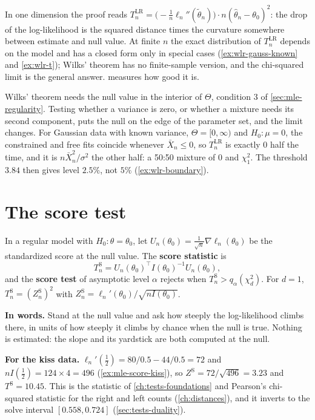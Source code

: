In one dimension the proof reads $T^{\mathrm{LR}}_n = \big(-\frac1n\ell_n''(\tilde{\theta}_n)\big)\cdot n(\hat{\theta}_n - \theta_0)^2$: the drop of the log-likelihood is the squared distance times the curvature somewhere between estimate and null value.
At finite $n$ the exact distribution of $T^{\mathrm{LR}}_n$ depends on the model and has a closed form only in special cases (\cref{ex:wlr-gauss-known} and \cref{ex:wlr-t}); Wilks' theorem has no finite-sample version, and the chi-squared limit is the general answer.
 measures how good it is.

\begin{pitfall}
Wilks' theorem needs the null value in the interior of $\Theta$, condition 3 of \cref{sec:mle-regularity}.
Testing whether a variance is zero, or whether a mixture needs its second component, puts the null on the edge of the parameter set, and the limit changes.
For Gaussian data with known variance, $\Theta = [0, \infty)$ and $H_0: \mu = 0$, the constrained and free fits coincide whenever $\bar{X}_n \leq 0$, so $T^{\mathrm{LR}}_n$ is exactly $0$ half the time, and it is $n\bar{X}_n^2/\sigma^2$ the other half: a 50:50 mixture of $0$ and $\chi^2_1$.
The threshold $3.84$ then gives level $2.5\%$, not $5\%$ (\cref{ex:wlr-boundary}).
\end{pitfall}

\section{The score test}
\label{sec:wlr-score}

\begin{definition}
\label{def:score-test}
In a regular model with $H_0: \theta = \theta_0$, let $U_n(\theta_0) = \frac{1}{\sqrt{n}}\nabla\ell_n(\theta_0)$ be the standardized score at the null value.
The \textbf{score statistic} is
\[
T^{\mathrm{S}}_n = U_n(\theta_0)^\top I(\theta_0)^{-1}U_n(\theta_0),
\]
and the \textbf{score test} of asymptotic level $\alpha$ rejects when $T^{\mathrm{S}}_n > q_\alpha(\chi^2_d)$.
For $d = 1$, $T^{\mathrm{S}}_n = (Z^{\mathrm{S}}_n)^2$ with $Z^{\mathrm{S}}_n = \ell_n'(\theta_0)/\sqrt{nI(\theta_0)}$.
\end{definition}

\begin{inwords}
\textbf{In words.} Stand at the null value and ask how steeply the log-likelihood climbs there, in units of how steeply it climbs by chance when the null is true. Nothing is estimated: the slope and its yardstick are both computed at the null.
\par\smallskip
\textbf{For the kiss data.} $\ell_n'(\frac12) = 80/0.5 - 44/0.5 = 72$ and $nI(\frac12) = 124 \times 4 = 496$ (\cref{ex:mle-score-kiss}), so $Z^{\mathrm{S}} = 72/\sqrt{496} = 3.23$ and $T^{\mathrm{S}} = 10.45$. This is the statistic of \cref{ch:tests-foundations} and Pearson's chi-squared statistic for the right and left counts (\cref{ch:distances}), and it inverts to the solve interval $[0.558, 0.724]$ (\cref{sec:tests-duality}).
\end{inwords}

